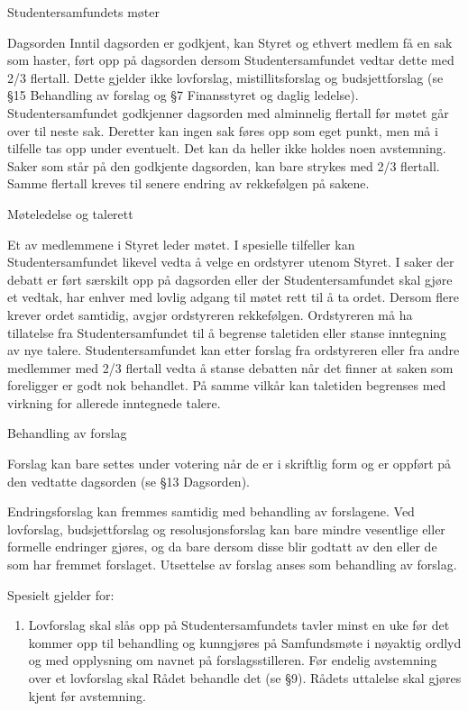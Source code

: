 \documentclass[fsbok.tex]{subfiles}
\begin{document}
\begin{lovkapittel}{Studentersamfundets møter}
\begin{lovparagraf}{Dagsorden}
Inntil dagsorden er godkjent, kan Styret og ethvert medlem få en sak som haster, ført opp på dagsorden dersom
Studentersamfundet vedtar dette med 2/3 flertall. Dette gjelder ikke lovforslag, mistillitsforslag og budsjettforslag (se
§15 Behandling av forslag og §7 Finansstyret og daglig ledelse). Studentersamfundet godkjenner dagsorden med
alminnelig flertall før møtet går over til neste sak. Deretter kan ingen sak føres opp som eget punkt, men må i tilfelle
tas opp under eventuelt. Det kan da heller ikke holdes noen avstemning. Saker som står på den godkjente dagsorden,
kan bare strykes med 2/3 flertall. Samme flertall kreves til senere endring av rekkefølgen på sakene.

  \end{lovparagraf}
  
  \begin{lovparagraf}{Møteledelse og talerett}

Et av medlemmene i Styret leder møtet. I spesielle tilfeller kan Studentersamfundet likevel vedta å velge en ordstyrer
utenom Styret. I saker der debatt er ført særskilt opp på dagsorden eller der Studentersamfundet skal gjøre et vedtak,
har enhver med lovlig adgang til møtet rett til å ta ordet. Dersom flere krever ordet samtidig, avgjør ordstyreren
rekkefølgen. Ordstyreren må ha tillatelse fra Studentersamfundet til å begrense taletiden eller stanse inntegning av nye
talere. Studentersamfundet kan etter forslag fra ordstyreren eller fra andre medlemmer med 2/3 flertall vedta å stanse
debatten når det finner at saken som foreligger er godt nok behandlet. På samme vilkår kan taletiden begrenses med
virkning for allerede inntegnede talere.

  \end{lovparagraf}
  
  \begin{lovparagraf}{Behandling av forslag}

Forslag kan bare settes under votering når de er i skriftlig form og er oppført på den vedtatte dagsorden (se §13
Dagsorden).

Endringsforslag kan fremmes samtidig med behandling av forslagene. Ved lovforslag, budsjettforslag og
resolusjonsforslag kan bare mindre vesentlige eller formelle endringer gjøres, og da bare dersom disse blir godtatt av
den eller de som har fremmet forslaget. Utsettelse av forslag anses som behandling av forslag.

Spesielt gjelder for:
\begin{enumerate}
\item Lovforslag skal slås opp på Studentersamfundets tavler minst en uke før det kommer opp til behandling og
kunngjøres på Samfundsmøte i nøyaktig ordlyd og med opplysning om navnet på forslagsstilleren. Før
endelig avstemning over et lovforslag skal Rådet behandle det (se §9). Rådets uttalelse skal gjøres kjent før
avstemning.


\end{enumerate}
\end{lovparagraf}
\end{lovkapittel}
\end{document}
